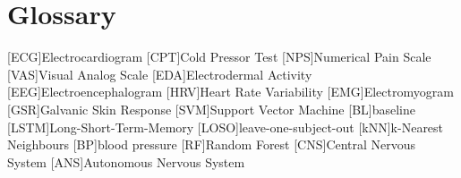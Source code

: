 \chapter{Glossary}

\footnotesize
\SingleSpacing

\begin{acronym}[AAAAAA]

	[ECG]{Electrocardiogram}
	[CPT]{Cold Pressor Test}
	[NPS]{Numerical Pain Scale}
	[VAS]{Visual Analog Scale}
	[EDA]{Electrodermal Activity}
	[EEG]{Electroencephalogram}
	[HRV]{Heart Rate Variability}
	[EMG]{Electromyogram}
	[GSR]{Galvanic Skin Response}
	[SVM]{Support Vector Machine}
	[BL]{baseline}
	[LSTM]{Long-Short-Term-Memory}
	[LOSO]{leave-one-subject-out}
	[kNN]{k-Nearest Neighbours}
	[BP]{blood pressure}
	[RF]{Random Forest}
	[CNS]{Central Nervous System}
	[ANS]{Autonomous Nervous System}

\end{acronym}

